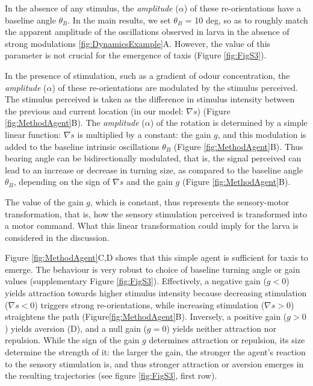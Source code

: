 \documentclass[11pt,a4paper]{article}
\newcommand{\todoBW}[1]{\todo[author=BW,color=orange, size=\tiny,inline]{#1}}
\begin{document}
In the absence of any stimulus, the {\it amplitude} ($\alpha$) of these re-orientations have a baseline angle $\theta_{B}$. In the main results, we set $\theta_{B}$ = 10 deg, so as to roughly match the apparent amplitude of the oscillations observed in larva in the absence of strong modulations \ref{fig:DynamicsExample}A. However, the value of this parameter is not crucial for the emergence of taxis (Figure \ref{fig:FigS3}).

In the presence of stimulation, such as a gradient of odour concentration, the {\it amplitude} ($\alpha$) of these re-orientations are modulated by the stimulus perceived. The stimulus perceived is taken as the difference in stimulus intensity between the previous and current location (in our model: $\nabla s$) (Figure \ref{fig:MethodAgent}B). 
The {\it amplitude} ($\alpha$) of the rotation is determined by a simple linear function: $\nabla s$ is multiplied by a constant: the gain $g$, and this modulation is added to the baseline intrinsic oscillations $\theta_{B}$ (Figure \ref{fig:MethodAgent}B). Thus bearing angle can be bidirectionally modulated, that is, the signal perceived can lead to an increase or decrease in turning size, as compared to the baseline angle $\theta_{B}$, depending on the sign of $\nabla s$  and the gain $g$ (Figure \ref{fig:MethodAgent}B).

The value of the gain $g$, which is constant, thus represents the sensory-motor transformation, that is, how the sensory stimulation perceived is transformed into a motor command. What this linear transformation could imply for the larva is considered in the discussion. 

Figure \ref{fig:MethodAgent}C,D shows that this simple agent is sufficient for taxis to emerge. The behaviour is very robust to choice of baseline turning angle or gain values (supplementary Figure \ref{fig:FigS3}). Effectively, a negative gain ($g<0$) yields attraction towards higher stimulus intensity because decreasing stimulation ($\nabla s<0$) triggers strong re-orientations, while increasing stimulation ($\nabla s>0$) straightens the path (Figure\ref{fig:MethodAgent}B). Inversely, a positive gain ($g>0$) yields aversion (D), and a null gain ($g=0$) yields neither attraction nor repulsion. While the sign of the gain $g$ determines attraction or repulsion, its size determine the strength of it: the larger the gain, the stronger the agent's reaction to the sensory stimulation is, and thus stronger attraction or aversion emerges in the resulting trajectories (see figure \ref{fig:FigS3}, first row).
\end{document}
